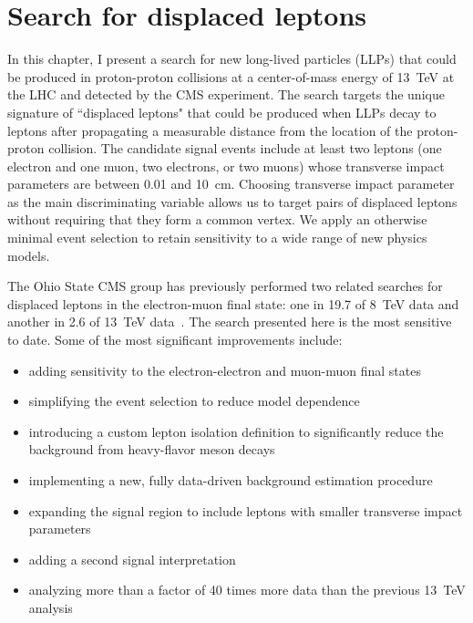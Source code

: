 \chapter{Search for displaced leptons}
\label{displaced_leptons}
In this chapter, I present a search for new long-lived particles (LLPs) that could be produced in proton-proton collisions at a center-of-mass energy of \SI{13}{\TeV} at the LHC and detected by the CMS experiment. The search targets the unique signature of ``displaced leptons" that could be produced when LLPs decay to leptons after propagating a measurable distance from the location of the proton-proton collision. The candidate signal events include at least two leptons (one electron and one muon, two electrons, or two muons) whose transverse impact parameters are between \num{0.01} and \SI{10}{\cm}. Choosing transverse impact parameter as the main discriminating variable allows us to target pairs of displaced leptons without requiring that they form a common vertex. We apply an otherwise minimal event selection to retain sensitivity to a wide range of new physics models.

The Ohio State CMS group has previously performed two related searches for displaced leptons in the electron-muon final state: one in \SI{19.7}{\invfb} of \SI{8}{\TeV} data and another in \SI{2.6}{\invfb} of \SI{13}{\TeV} data~\cite{displaced_leptons_run1, displaced_leptons_bing}. The search presented here is the most sensitive to date. Some of the most significant improvements include:
\begin{itemize}
    \itemsep0em
    \item adding sensitivity to the electron-electron and muon-muon final states
    \item simplifying the event selection to reduce model dependence
    \item introducing a custom lepton isolation definition to significantly reduce the background from heavy-flavor meson decays
    \item implementing a new, fully data-driven background estimation procedure
    \item expanding the signal region to include leptons with smaller transverse impact parameters
    \item adding a second signal interpretation
    \item analyzing more than a factor of \num{40} times more data than the previous \SI{13}{\TeV} analysis~\cite{displaced_leptons_bing}
\end{itemize}

